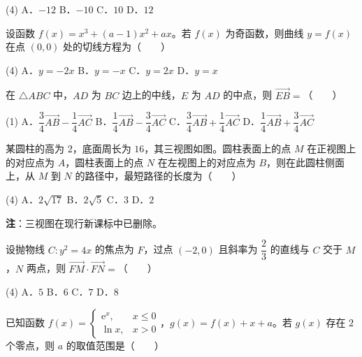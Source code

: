 \begin{gkopts}(4)
\task A．$-12$
\task B．$-10$
\task C．$10$
\task D．$12$
\end{gkopts}

设函数 $f(x)=x^{3}+(a-1)x^{2}+ax$。若 $f(x)$ 为奇函数，则曲线 $y=f(x)$ 在点 $(0,0)$ 处的切线方程为（　　）

\begin{gkopts}(4)
\task A．$y=-2x$
\task B．$y=-x$
\task C．$y=2x$
\task D．$y=x$
\end{gkopts}

在 $\triangle ABC$ 中，$AD$ 为 $BC$ 边上的中线，$E$ 为 $AD$ 的中点，则 $\overrightarrow{EB}=$（　　）

\begin{gkopts}(1)
\task A．$\dfrac34\overrightarrow{AB}-\dfrac14\overrightarrow{AC}$
\task B．$\dfrac14\overrightarrow{AB}-\dfrac34\overrightarrow{AC}$
\task C．$\dfrac34\overrightarrow{AB}+\dfrac14\overrightarrow{AC}$
\task D．$\dfrac14\overrightarrow{AB}+\dfrac34\overrightarrow{AC}$
\end{gkopts}

某圆柱的高为 $2$，底面周长为 $16$，其三视图如图。圆柱表面上的点 $M$ 在正视图上的对应点为 $A$，圆柱表面上的点 $N$ 在左视图上的对应点为 $B$，则在此圆柱侧面上，从 $M$ 到 $N$ 的路径中，最短路径的长度为（　　）

\begin{center}\end{center}

\begin{gkopts}(4)
\task A．$2\sqrt{17}$
\task B．$2\sqrt5$
\task C．$3$
\task D．$2$
\end{gkopts}

\begin{gktip}
\textbf{注}：三视图在现行新课标中已删除。
\end{gktip}

设抛物线 $C:y^{2}=4x$ 的焦点为 $F$，过点 $(-2,0)$ 且斜率为 $\dfrac23$ 的直线与 $C$ 交于 $M$，$N$ 两点，则 $\overrightarrow{FM}\cdot\overrightarrow{FN}=$（　　）

\begin{gkopts}(4)
\task A．$5$
\task B．$6$
\task C．$7$
\task D．$8$
\end{gkopts}

已知函数 $f(x)=\begin{cases}\mathrm e^{x},&x\le0\\ \ln x,&x>0\end{cases}$，$g(x)=f(x)+x+a$。若 $g(x)$ 存在 $2$ 个零点，则 $a$ 的取值范围是（　　）

